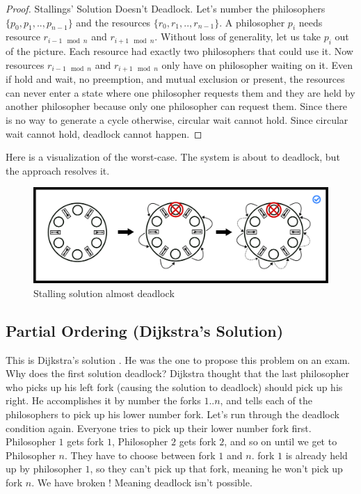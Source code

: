 \begin{proof} Stallings' Solution Doesn't Deadlock.
	Let's number the philosophers $\{p_0, p_1, .., p_{n-1}\}$ and the resources $\{r_0, r_1, .., r_{n-1}\}$.
	A philosopher $p_i$ needs resource $r_{i-1 \mod n}$ and $r_{i + 1 \mod n}$.
	Without loss of generality, let us take $p_i$ out of the picture.
	Each resource had exactly two philosophers that could use it.
	Now resources $r_{i-1 \mod n}$ and $r_{i + 1 \mod n}$ only have on philosopher waiting on it.
	Even if hold and wait, no preemption, and mutual exclusion or present, the resources can never enter a state where one philosopher requests them and they are held by another philosopher because only one philosopher can request them.
	Since there is no way to generate a cycle otherwise, circular wait cannot hold.
	Since circular wait cannot hold, deadlock cannot happen.
\end{proof}

Here is a visualization of the worst-case.
The system is about to deadlock, but the approach resolves it.

\begin{figure}[H]
	\centering
	\includegraphics[width=.9\textwidth]{deadlock/drawings/dining_stalling.eps}
	\caption{Stalling solution almost deadlock}
\end{figure}


\subsection{Partial Ordering (Dijkstra's Solution)}

This is Dijkstra's solution \cite[P. 20]{EWD:EWD310}. He was the one to propose this problem on an exam.
Why does the first solution deadlock? Dijkstra thought that the last philosopher who picks up his left fork (causing the solution to deadlock) should pick up his right.
He accomplishes it by number the forks $1..n$, and tells each of the philosophers to pick up his lower number fork.
Let's run through the deadlock condition again.
Everyone tries to pick up their lower number fork first.
Philosopher $1$ gets fork $1$, Philosopher $2$ gets fork $2$, and so on until we get to Philosopher $n$.
They have to choose between fork $1$ and $n$.
fork $1$ is already held up by philosopher $1$, so they can't pick up that fork, meaning he won't pick up fork $n$.
We have broken ! Meaning deadlock isn't possible.

